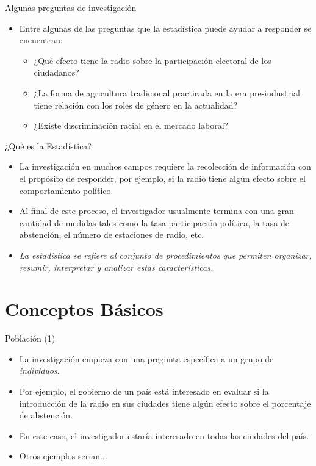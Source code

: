 \documentclass[xcolor=dvipsnames]{beamer}
\begin{document}
\begin{frame}{Algunas preguntas de investigación}
\begin{itemize}
	\justifying
	\item Entre algunas de las preguntas que la estadística puede ayudar a responder se encuentran:
	\begin{itemize}
		\justifying
\item ¿Qué efecto tiene la radio sobre la participación electoral de los ciudadanos?
\item ¿La forma de agricultura tradicional practicada en la era pre-industrial tiene relación con los roles de género en la actualidad?
\item ¿Existe discriminación racial en el mercado laboral?
	\end{itemize}
\end{itemize}
\end{frame}


\begin{frame}{¿Qué es la Estadística?}
\begin{itemize}
	\justifying
\item La investigación en muchos campos requiere la recolección de información con el propósito de responder, por ejemplo, si la radio tiene algún efecto sobre el comportamiento político.
\item Al final de este proceso, el investigador usualmente termina con una gran cantidad de medidas tales como la tasa participación política, la tasa de abstención, el número de estaciones de radio, etc.
\item \emph{La estadística se refiere al conjunto de procedimientos que permiten organizar, resumir, interpretar y analizar estas características.}

\end{itemize}
\end{frame}


\section{Conceptos Básicos}

\begin{frame}{Población (1)}
\begin{itemize}
\justifying
\item La investigación empieza con una pregunta específica a un grupo de \emph{individuos}.
\item Por ejemplo, el gobierno de un país está interesado en evaluar si la introducción de la radio en sus ciudades tiene algún efecto sobre el porcentaje de abstención.
\item En este caso, el investigador estaría interesado en todas las ciudades del país.
\item Otros ejemplos serian...
\end{itemize}
\end{frame}
\end{document}

